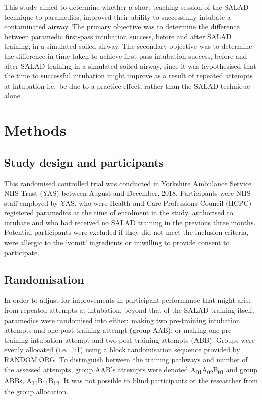 \documentclass[]{article}
\begin{document}
This study aimed to determine whether a short teaching session of the
SALAD technique to paramedics, improved their ability to successfully
intubate a contaminated airway. The primary objective was to determine
the difference between paramedic first-pass intubation success, before
and after SALAD training, in a simulated soiled airway. The secondary
objective was to determine the difference in time taken to achieve
first-pass intubation success, before and after SALAD training in a
simulated soiled airway, since it was hypothesised that the time to
successful intubation might improve as a result of repeated attempts at
intubation i.e.~be due to a practice effect, rather than the SALAD
technique alone.

\hypertarget{methods-1}{%
\section{Methods}\label{methods-1}}

\hypertarget{study-design-and-participants}{%
\subsection{Study design and
participants}\label{study-design-and-participants}}

This randomised controlled trial was conducted in Yorkshire Ambulance
Service NHS Trust (YAS) between August and December, 2018. Participants
were NHS staff employed by YAS, who were Health and Care Professions
Council (HCPC) registered paramedics at the time of enrolment in the
study, authorised to intubate and who had received no SALAD training in
the previous three months. Potential participants were excluded if they
did not meet the inclusion criteria, were allergic to the `vomit'
ingredients or unwilling to provide consent to participate.

\hypertarget{randomisation}{%
\subsection{Randomisation}\label{randomisation}}

In order to adjust for improvements in participant performance that
might arise from repeated attempts at intubation, beyond that of the
SALAD training itself, paramedics were randomised into either: making
two pre-training intubation attempts and one post-training attempt
(group AAB); or making one pre-training intubation attempt and two
post-training attempts (ABB). Groups were evenly allocated (i.e.~1:1)
using a block randomisation sequence provided by RANDOM.ORG. To
distinguish between the training pathways and number of the assessed
attempts, group AAB's attempts were denoted
A\textsubscript{01}A\textsubscript{02}B\textsubscript{01} and group
ABBs, A\textsubscript{11}B\textsubscript{11}B\textsubscript{12}. It was
not possible to blind participants or the researcher from the group
allocation.
\end{document}
